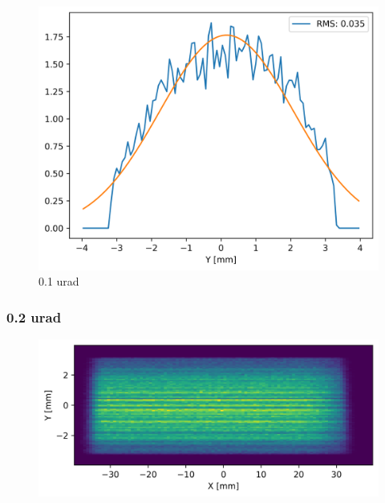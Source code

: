 \begin{figure}[H]
\centering
\includegraphics[width=0.9\linewidth]{./../figures/slope_error/WB4C_d30_d-spacing_gradient_45keV_slope_error01urad_Yprofile.png}
\caption{0.1 urad}
\label{fig:01urad}
\end{figure}

\clearpage
\subsubsection{0.2 urad}
\begin{figure}[H]
\centering
\includegraphics[width=0.9\linewidth]{./../figures/slope_error/WB4C_d30_d-spacing_gradient_45keV_slope_error02urad.png}
\end{figure}

